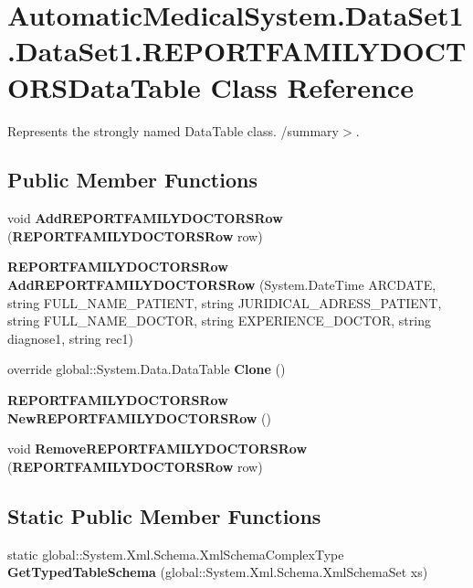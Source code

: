 \section{AutomaticMedicalSystem.DataSet1.DataSet1.REPORTFAMILYDOCTORSDataTable Class Reference}
\label{class_automatic_medical_system_1_1_data_set1_1_1_r_e_p_o_r_t_f_a_m_i_l_y_d_o_c_t_o_r_s_data_table}
Represents the strongly named DataTable class. /summary$>$.  


\subsection*{Public Member Functions}
\begin{CompactItemize}
\item 
void \textbf{AddREPORTFAMILYDOCTORSRow} ({\bf REPORTFAMILYDOCTORSRow} row)\label{class_automatic_medical_system_1_1_data_set1_1_1_r_e_p_o_r_t_f_a_m_i_l_y_d_o_c_t_o_r_s_data_table_1f5013d9c62cf64ba863d327890ee0fe}

\item 
{\bf REPORTFAMILYDOCTORSRow} \textbf{AddREPORTFAMILYDOCTORSRow} (System.DateTime ARCDATE, string FULL\_\-NAME\_\-PATIENT, string JURIDICAL\_\-ADRESS\_\-PATIENT, string FULL\_\-NAME\_\-DOCTOR, string EXPERIENCE\_\-DOCTOR, string diagnose1, string rec1)\label{class_automatic_medical_system_1_1_data_set1_1_1_r_e_p_o_r_t_f_a_m_i_l_y_d_o_c_t_o_r_s_data_table_bca425fb30323d1ae16a8a4d350f9a86}

\item 
override global::System.Data.DataTable \textbf{Clone} ()\label{class_automatic_medical_system_1_1_data_set1_1_1_r_e_p_o_r_t_f_a_m_i_l_y_d_o_c_t_o_r_s_data_table_d41380016a1e4012ccd8e9335cab6c7b}

\item 
{\bf REPORTFAMILYDOCTORSRow} \textbf{NewREPORTFAMILYDOCTORSRow} ()\label{class_automatic_medical_system_1_1_data_set1_1_1_r_e_p_o_r_t_f_a_m_i_l_y_d_o_c_t_o_r_s_data_table_2123f9e66efa7fc617f0680f83bde1ee}

\item 
void \textbf{RemoveREPORTFAMILYDOCTORSRow} ({\bf REPORTFAMILYDOCTORSRow} row)\label{class_automatic_medical_system_1_1_data_set1_1_1_r_e_p_o_r_t_f_a_m_i_l_y_d_o_c_t_o_r_s_data_table_b4e3b36de7c216662ff07c88733f80fc}

\end{CompactItemize}
\subsection*{Static Public Member Functions}
\begin{CompactItemize}
\item 
static global::System.Xml.Schema.XmlSchemaComplexType \textbf{GetTypedTableSchema} (global::System.Xml.Schema.XmlSchemaSet xs)\label{class_automatic_medical_system_1_1_data_set1_1_1_r_e_p_o_r_t_f_a_m_i_l_y_d_o_c_t_o_r_s_data_table_cc3db15588a9b7cc9fec331149c6d3b5}

\end{CompactItemize}
